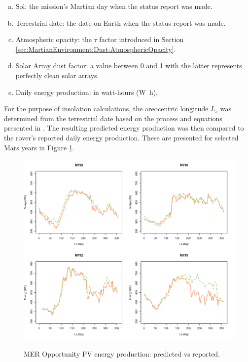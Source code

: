 \begin{enumerate}[(a)]
  \item Sol: the mission's Martian day when the status report was made.
  \item Terrestrial date: the date on Earth when the status report was made.
  \item Atmospheric opacity: the $\tau$ factor introduced in Section \ref{sec:MartianEnvironment:Dust:AtmosphericOpacity}.
  \item Solar Array dust factor: a value between 0 and 1 with the latter represents perfectly clean solar arrays.
  \item Daily energy production: in watt-hours (\si{\watt\hour}).
\end{enumerate}

For the purpose of insolation calculations, the areocentric longitude $L_{s}$ was determined from the terrestrial date based on the process and equations presented in . The resulting predicted energy production was then compared to the rover's reported daily energy production. These are presented for selected Mars years in Figure \ref{fig:plot:mer-energy-production-predicted-vs-reported}.

\begin{figure}[H]
  \centering
  \hypersetup{linkcolor=captionTextColor}
  \includegraphics[width=0.8\linewidth]{sections/power-and-energy-predictions/plots/energy-production-predicted-vs-reported.png}\\
  \caption[MER Opportunity PV energy production: predicted vs reported]
          {MER Opportunity PV energy production: predicted vs reported.}
  \label{fig:plot:mer-energy-production-predicted-vs-reported}
\end{figure}

